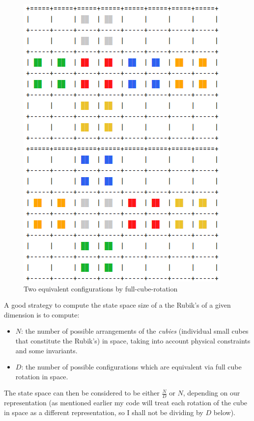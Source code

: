 \begin{figure}[H]
\centering
\includegraphics[scale=0.4]{./Figures/equivalentcubes}
\caption[Reducing RC]{Two equivalent configurations by full-cube-rotation}
\label{fig:configurations}
\end{figure}



\label{Theory:333RCSSS}

A good strategy to compute the state space size of a the Rubik's of a given dimension is to compute:
\begin{itemize}
\item $N$: the number of possible arrangements of the \textit{cubies} (individual small cubes that constitute the Rubik's) in space, taking into account physical constraints and some invariants.
\item $D$: the number of possible configurations which are equivalent via full cube rotation in space.
\end{itemize}
The state space can then be considered to be either $\frac{N}{D}$ or $N$, depending on our representation (as mentioned earlier my code will treat each rotation of the cube in space as a different representation, so I shall not be dividing by $D$ below).

